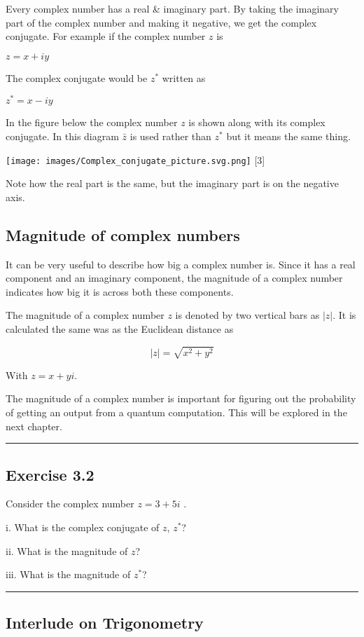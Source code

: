 \documentclass{book}
\begin{document}
Every complex number has a real \& imaginary part. By taking the imaginary part of the complex number and making it negative, we get the complex conjugate. For example if the complex number $z$ is 

$z = x + iy$ 

The complex conjugate would be $z^*$ written as 

$z^* = x - iy$ 

In the figure below the complex number $z$ is shown along with its complex conjugate. In this diagram $\bar{z}$ is used rather than $z^*$ but it means the same thing.  

\texttt{[image: images/Complex\_conjugate\_picture.svg.png]}
 [3]

 Note how the real part is the same, but the imaginary part is on the negative axis. 

 \subsection{ Magnitude of complex numbers }

 It can be very useful to describe how big a complex number is. Since it has a real component and an imaginary component, the magnitude of a complex number indicates how big it is across both these components. 

 The magnitude of a complex number $z$ is denoted by two vertical bars as $|z|$. It is calculated the same was as the Euclidean distance as 

 $$|z| = \sqrt{x^2 + y^2}$$

 With $z = x + yi$. 

 The magnitude of a complex number is important for figuring out the probability of getting an output from a quantum computation. This will be explored in the next chapter.\hrule

\subsection{Exercise 3.2}


Consider the complex number $z = 3 + 5i$ . 

i. What is the complex conjugate of $z$, $z^*$?
 
ii. What is the magnitude of $z$?

iii. What is the magnitude of $z^*$?
\hrule
\subsection{ Interlude on Trigonometry } 
\end{document}
